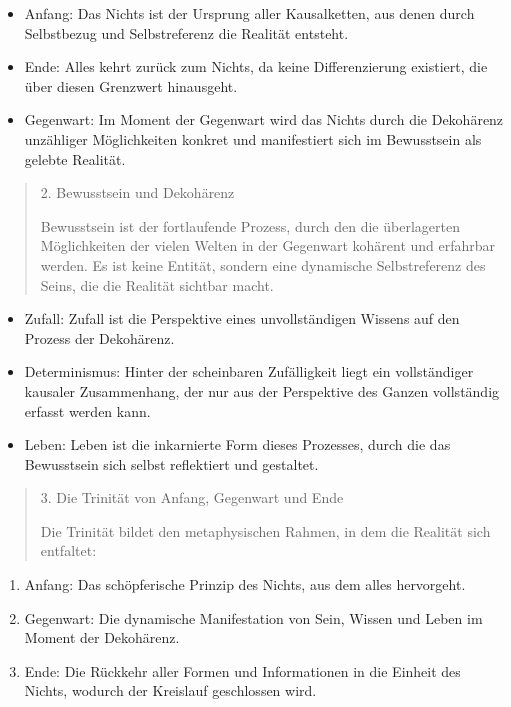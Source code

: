 \documentclass[
  ngerman,
]{article}
\begin{document}
\begin{itemize}
\item
  Anfang: Das Nichts ist der Ursprung aller Kausalketten, aus denen
  durch Selbstbezug und Selbstreferenz die Realität entsteht.
\item
  Ende: Alles kehrt zurück zum Nichts, da keine Differenzierung
  existiert, die über diesen Grenzwert hinausgeht.
\item
  Gegenwart: Im Moment der Gegenwart wird das Nichts durch die
  Dekohärenz unzähliger Möglichkeiten konkret und manifestiert sich im
  Bewusstsein als gelebte Realität.
\end{itemize}

\begin{quote}
2. Bewusstsein und Dekohärenz

Bewusstsein ist der fortlaufende Prozess, durch den die überlagerten
Möglichkeiten der vielen Welten in der Gegenwart kohärent und erfahrbar
werden. Es ist keine Entität, sondern eine dynamische Selbstreferenz des
Seins, die die Realität sichtbar macht.
\end{quote}

\begin{itemize}
\item
  Zufall: Zufall ist die Perspektive eines unvollständigen Wissens auf
  den Prozess der Dekohärenz.
\item
  Determinismus: Hinter der scheinbaren Zufälligkeit liegt ein
  vollständiger kausaler Zusammenhang, der nur aus der Perspektive des
  Ganzen vollständig erfasst werden kann.
\item
  Leben: Leben ist die inkarnierte Form dieses Prozesses, durch die das
  Bewusstsein sich selbst reflektiert und gestaltet.
\end{itemize}

\begin{quote}
3. Die Trinität von Anfang, Gegenwart und Ende

Die Trinität bildet den metaphysischen Rahmen, in dem die Realität sich
entfaltet:
\end{quote}

\begin{enumerate}
\def\labelenumi{\arabic{enumi}.}
\item
  Anfang: Das schöpferische Prinzip des Nichts, aus dem alles
  hervorgeht.
\item
  Gegenwart: Die dynamische Manifestation von Sein, Wissen und Leben im
  Moment der Dekohärenz.
\item
  Ende: Die Rückkehr aller Formen und Informationen in die Einheit des
  Nichts, wodurch der Kreislauf geschlossen wird.
\end{enumerate}
\end{document}
